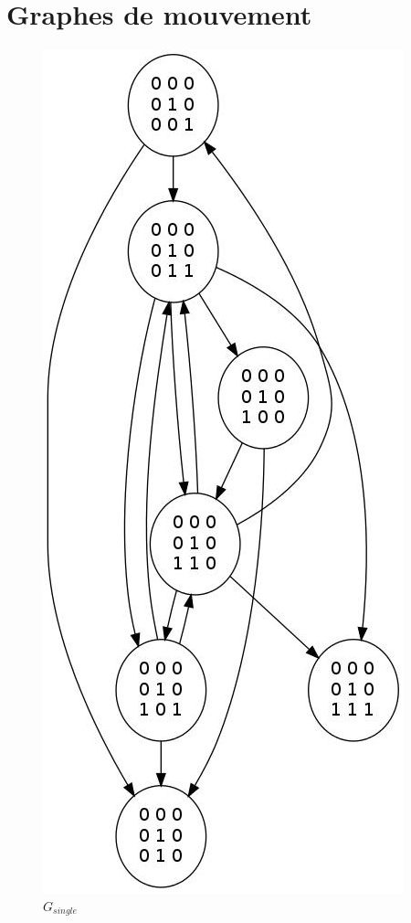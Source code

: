 \section{Graphes de mouvement}

\begin{figure}[h!]
  \includegraphics[scale=0.50]{body/images/graph_single_all.jpg}
  \caption{$G_{single}$}
  \label{fig:graph_single_all}
\end{figure}

